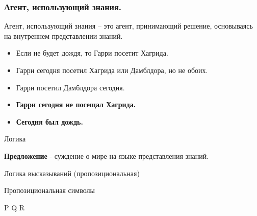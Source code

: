 \begin{frame}
	\frametitle{Агент, использующий знания.}
	Агент, использующий знания --  это агент, принимающий решение, основываясь на 
	внутреннем представлении знаний.
\end{frame}
\begin{frame}
	\begin{itemize}[label={}]
		\item Если не будет дождя, то Гарри посетит Хагрида.
		\item Гарри сегодня посетил Хагрида или Дамблдора, но не обоих.
		\item Гарри посетил Дамблдора сегодня.
		\pause
		\item \textbf{Гарри сегодня не посещал Хагрида.}
		\pause
		\item \textbf{Сегодня был дождь.}
	\end{itemize}
\end{frame}
\begin{frame}
	\begin{center}
		\Huge Логика
	\end{center}
\end{frame}
\begin{frame}
	\Large \textbf{Предложение} - суждение о мире на языке
	представления знаний.
\end{frame}

\begin{frame}
	\begin{center}
	\Huge Логика высказываний \large(пропозициональная)
	\end{center}
\end{frame}

\begin{frame}
	\begin{center}
	\Huge Пропозициональная символы

	P\; Q\; R
	\end{center}
\end{frame}


